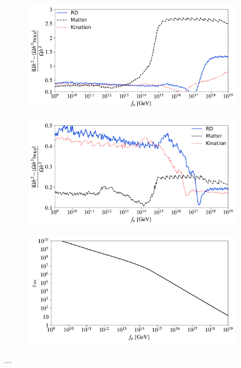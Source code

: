 \documentclass[11pt,a4paper]{article}
\begin{document}
\begin{figure}[t]
	\begin{subfigure}[]{0.5\textwidth}
		\includegraphics[width=1\textwidth]{figs/WKB_diff_i.pdf}
		\caption{}
		\label{fig:WKB_diff_i}
	\end{subfigure}
	\begin{subfigure}[]{0.5\textwidth}
		\includegraphics[width=1\textwidth]{figs/WKB_diff_osc.pdf}
		\caption{}
		\label{fig:WKB_diff_osc}
	\end{subfigure}
	\begin{center}
	\begin{subfigure}[]{0.5\textwidth}
		\includegraphics[width=1\textwidth]{figs/gamma_osc.pdf}
		\caption{}
		\label{fig:gamma_osc}
	\end{subfigure}
	\end{center}
\caption{...}
\label{fig:WKB_diff}
\end{figure}
%
\end{document}
